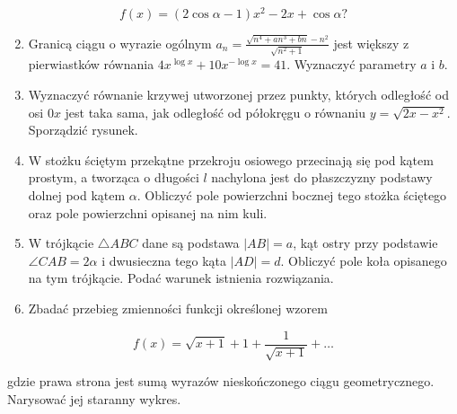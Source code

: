 \documentclass[10pt]{article}
\begin{document}
$$
f(x)=(2 \cos \alpha-1) x^{2}-2 x+\cos \alpha ?
$$

\begin{enumerate}
  \setcounter{enumi}{1}
  \item Granicą ciągu o wyrazie ogólnym $a_{n}=\frac{\sqrt{n^{4}+a n^{3}+b n}-n^{2}}{\sqrt{n^{2}+1}}$ jest większy z pierwiastków równania $4 x^{\log x}+10 x^{-\log x}=41$. Wyznaczyć parametry $a$ i $b$.
  \item Wyznaczyć równanie krzywej utworzonej przez punkty, których odległość od osi $0 x$ jest taka sama, jak odległość od półokręgu o równaniu $y=\sqrt{2 x-x^{2}}$. Sporządzić rysunek.
  \item W stożku ściętym przekątne przekroju osiowego przecinają się pod kątem prostym, a tworząca o długości $l$ nachylona jest do płaszczyzny podstawy dolnej pod kątem $\alpha$. Obliczyć pole powierzchni bocznej tego stożka ściętego oraz pole powierzchni opisanej na nim kuli.
  \item W trójkącie $\triangle A B C$ dane są podstawa $|A B|=a$, kąt ostry przy podstawie $\angle C A B=2 \alpha$ i dwusieczna tego kąta $|A D|=d$. Obliczyć pole koła opisanego na tym trójkącie. Podać warunek istnienia rozwiązania.
  \item Zbadać przebieg zmienności funkcji określonej wzorem
\end{enumerate}

$$
f(x)=\sqrt{x+1}+1+\frac{1}{\sqrt{x+1}}+\ldots
$$

gdzie prawa strona jest sumą wyrazów nieskończonego ciągu geometrycznego. Narysować jej staranny wykres.
\end{document}
